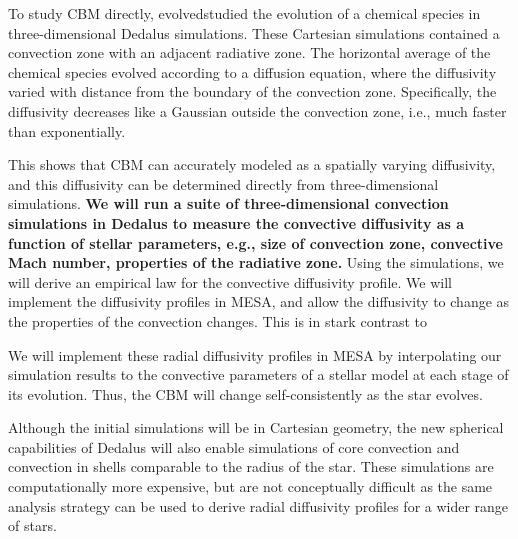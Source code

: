 To study CBM directly, \citet{Lecoanet_2016a} evolvedstudied the evolution of a chemical species in three-dimensional Dedalus simulations.  These Cartesian simulations contained a convection zone with an adjacent radiative zone. The horizontal average of the chemical species evolved according to a diffusion equation, where the diffusivity varied with distance from the boundary of the convection zone. Specifically, the diffusivity decreases like a Gaussian outside the convection zone, i.e., much faster than exponentially.

This shows that CBM can accurately modeled as a spatially varying diffusivity, and this diffusivity can be determined directly from three-dimensional simulations. \textbf{We will run a suite of three-dimensional convection simulations in Dedalus to measure the convective diffusivity as a function of stellar parameters, e.g., size of convection zone, convective Mach number, properties of the radiative zone.} Using the simulations, we will derive an empirical law for the convective diffusivity profile. We will implement the diffusivity profiles in MESA, and allow the diffusivity to change as the properties of the convection changes. This is in stark contrast to 

We will implement these radial diffusivity profiles in MESA by interpolating our simulation results to the convective parameters of a stellar model at each stage of its evolution. Thus, the CBM will change self-consistently as the star evolves.

Although the initial simulations will be in Cartesian geometry, the new spherical capabilities of Dedalus will also enable simulations of core convection and convection in shells comparable to the radius of the star. These simulations are computationally more expensive, but are not conceptually difficult as the same analysis strategy can be used to derive radial diffusivity profiles for a wider range of stars.
